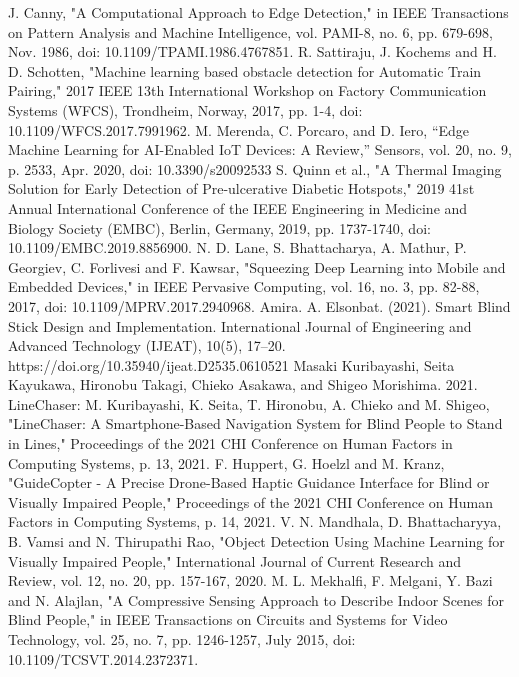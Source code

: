 \documentclass{svproc}
\begin{document}
\begin{thebibliography}{00}
     J. Canny, "A Computational Approach to Edge Detection," in IEEE Transactions on Pattern Analysis and Machine Intelligence, vol. PAMI-8, no. 6, pp. 679-698, Nov. 1986, doi: 10.1109/TPAMI.1986.4767851.
     R. Sattiraju, J. Kochems and H. D. Schotten, "Machine learning based obstacle detection for Automatic Train Pairing," 2017 IEEE 13th International Workshop on Factory Communication Systems (WFCS), Trondheim, Norway, 2017, pp. 1-4, doi: 10.1109/WFCS.2017.7991962.
     M. Merenda, C. Porcaro, and D. Iero, “Edge Machine Learning for AI-Enabled IoT Devices: A Review,” Sensors, vol. 20, no. 9, p. 2533, Apr. 2020, doi: 10.3390/s20092533
     S. Quinn et al., "A Thermal Imaging Solution for Early Detection of Pre-ulcerative Diabetic Hotspots," 2019 41st Annual International Conference of the IEEE Engineering in Medicine and Biology Society (EMBC), Berlin, Germany, 2019, pp. 1737-1740, doi: 10.1109/EMBC.2019.8856900.
     N. D. Lane, S. Bhattacharya, A. Mathur, P. Georgiev, C. Forlivesi and F. Kawsar, "Squeezing Deep Learning into Mobile and Embedded Devices," in IEEE Pervasive Computing, vol. 16, no. 3, pp. 82-88, 2017, doi: 10.1109/MPRV.2017.2940968.
     Amira. A. Elsonbat. (2021). Smart Blind Stick Design and Implementation. International Journal of Engineering and Advanced Technology (IJEAT), 10(5), 17–20. https://doi.org/10.35940/ijeat.D2535.0610521       
     Masaki Kuribayashi, Seita Kayukawa, Hironobu Takagi, Chieko Asakawa, and Shigeo Morishima. 2021. LineChaser: M. Kuribayashi, K. Seita, T. Hironobu, A. Chieko and M. Shigeo, "LineChaser: A Smartphone-Based Navigation System for Blind People to Stand in Lines," Proceedings of the 2021 CHI Conference on Human Factors in Computing Systems, p. 13, 2021.       
     F. Huppert, G. Hoelzl and M. Kranz, "GuideCopter - A Precise Drone-Based Haptic Guidance Interface for Blind or Visually Impaired People," Proceedings of the 2021 CHI Conference on Human Factors in Computing Systems, p. 14, 2021.      
     V. N. Mandhala, D. Bhattacharyya, B. Vamsi and N. Thirupathi Rao, "Object Detection Using Machine Learning for Visually Impaired People," International Journal of Current Research and Review, vol. 12, no. 20, pp. 157-167, 2020.      
     M. L. Mekhalfi, F. Melgani, Y. Bazi and N. Alajlan, "A Compressive Sensing Approach to Describe Indoor Scenes for Blind People," in IEEE Transactions on Circuits and Systems for Video Technology, vol. 25, no. 7, pp. 1246-1257, July 2015, doi: 10.1109/TCSVT.2014.2372371.

\end{thebibliography}
\end{document}
